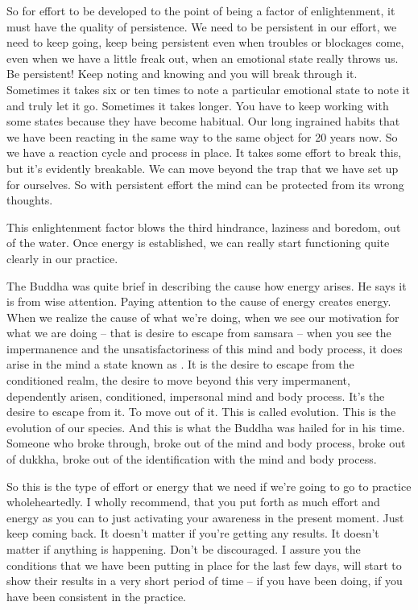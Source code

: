 \documentclass[letterpaper,10pt,english]{sphinxmanual}
\begin{document}
\sphinxAtStartPar
So for effort to be developed to the point of being a factor of enlightenment, it must have the quality of persistence. We need to be persistent in our
effort, we need to keep going, keep being persistent even when troubles or
blockages come, even when we have a little freak out, when an emotional
state really throws us. Be persistent! Keep noting and knowing and you will
break  through  it.  Sometimes  it  takes  six  or  ten  times  to  note  a  particular
emotional state to note it and truly let it go. Sometimes it takes longer. You
have to keep working with some states because they have become habitual.
Our long ingrained habits that we have been reacting in the same way to the
same object for 20 years now. So we have a reaction cycle and process in
place. It takes some effort to break this, but it’s evidently breakable. We can
move beyond the trap that we have set up for ourselves. So with persistent
effort the mind can be protected from its wrong thoughts.

\sphinxAtStartPar
This enlightenment factor blows the third hindrance, laziness and boredom, out of the water. Once energy is established, we can really start functioning quite clearly in our practice.

\sphinxAtStartPar
The Buddha was quite brief in describing the cause how energy arises.
He says it is from wise attention. Paying attention to the cause of energy creates energy. When we realize the cause of what we’re doing, when we see
our motivation for what we are doing – that is desire to escape from samsara
– when you see the impermanence and the unsatisfactoriness of this mind
and body process, it does arise in the mind a state known as
. It is
the desire to escape from the conditioned realm, the desire to move beyond
this  very  impermanent,  dependently  arisen,  conditioned,  impersonal  mind
and body process. It’s the desire to escape from it. To move out of it. This
is called evolution. This is the evolution of our species. And this is what the
Buddha was hailed for in his time. Someone who broke through, broke out
of the mind and body process, broke out of dukkha, broke out of the identification with the mind and body process.

\sphinxAtStartPar
So this is the type of effort or energy that we need if we’re going to go
to practice wholeheartedly. I wholly recommend, that you put forth as much
effort and energy as you can to just activating your awareness in the present moment. Just keep coming back. It doesn’t matter if you’re getting any
  results. It doesn’t matter if anything is happening. Don’t be discouraged. I
assure you the conditions that we have been putting in place for the last few
days, will start to show their results in a very short period of time – if you
have been doing, if you have been consistent in the practice.
\end{document}
